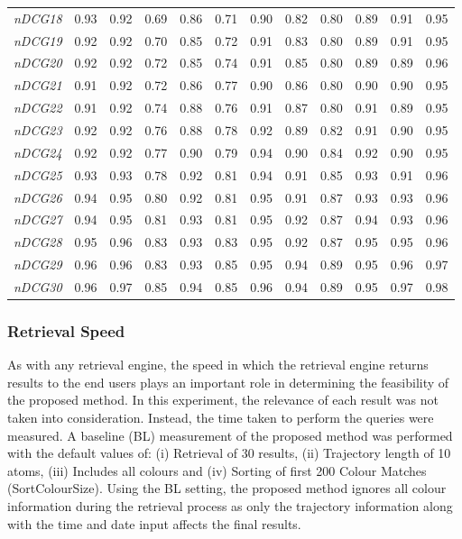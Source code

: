 \begin{table}[ht!]
{\begin{tabular}{c||c|c|c|c|c|c|c|c|c|c|c}
\textit{nDCG18} & 0.93 & 0.92 & 0.69 & 0.86 & 0.71 & 0.90 & 0.82 & 0.80 & 0.89 & 0.91 & 0.95 \\
\textit{nDCG19} & 0.92 & 0.92 & 0.70 & 0.85 & 0.72 & 0.91 & 0.83 & 0.80 & 0.89 & 0.91 & 0.95 \\
\textit{nDCG20} & 0.92 & 0.92 & 0.72 & 0.85 & 0.74 & 0.91 & 0.85 & 0.80 & 0.89 & 0.89 & 0.96 \\
\textit{nDCG21} & 0.91 & 0.92 & 0.72 & 0.86 & 0.77 & 0.90 & 0.86 & 0.80 & 0.90 & 0.90 & 0.95 \\
\textit{nDCG22} & 0.91 & 0.92 & 0.74 & 0.88 & 0.76 & 0.91 & 0.87 & 0.80 & 0.91 & 0.89 & 0.95 \\
\textit{nDCG23} & 0.92 & 0.92 & 0.76 & 0.88 & 0.78 & 0.92 & 0.89 & 0.82 & 0.91 & 0.90 & 0.95 \\
\textit{nDCG24} & 0.92 & 0.92 & 0.77 & 0.90 & 0.79 & 0.94 & 0.90 & 0.84 & 0.92 & 0.90 & 0.95 \\
\textit{nDCG25} & 0.93 & 0.93 & 0.78 & 0.92 & 0.81 & 0.94 & 0.91 & 0.85 & 0.93 & 0.91 & 0.96 \\
\textit{nDCG26} & 0.94 & 0.95 & 0.80 & 0.92 & 0.81 & 0.95 & 0.91 & 0.87 & 0.93 & 0.93 & 0.96 \\
\textit{nDCG27} & 0.94 & 0.95 & 0.81 & 0.93 & 0.81 & 0.95 & 0.92 & 0.87 & 0.94 & 0.93 & 0.96 \\
\textit{nDCG28} & 0.95 & 0.96 & 0.83 & 0.93 & 0.83 & 0.95 & 0.92 & 0.87 & 0.95 & 0.95 & 0.96 \\
\textit{nDCG29} & 0.96 & 0.96 & 0.83 & 0.93 & 0.85 & 0.95 & 0.94 & 0.89 & 0.95 & 0.96 & 0.97 \\
\textit{nDCG30} & 0.96 & 0.97 & 0.85 & 0.94 & 0.85 & 0.96 & 0.94 & 0.89 & 0.95 & 0.97 & 0.98 \\
\end{tabular}}
\end{table}


\subsubsection{Retrieval Speed}

As with any retrieval engine, the speed in which the retrieval engine returns results to the end users plays an important role in determining the feasibility of the proposed method. In this experiment, the relevance of each result was not taken into consideration. Instead, the time taken to perform the queries were measured. A baseline (BL) measurement of the proposed method was performed with the default values of: (i) Retrieval of 30 results, (ii) Trajectory length of 10 atoms, (iii) Includes all colours and (iv) Sorting of first 200 Colour Matches (SortColourSize).
Using the BL setting, the proposed method ignores all colour information during the retrieval process as only the trajectory information along with the time and date input affects the final results.


